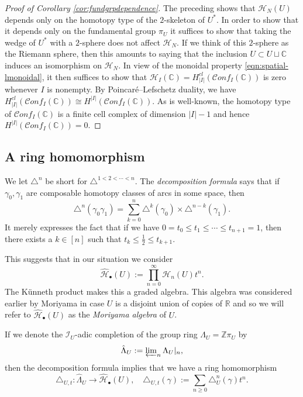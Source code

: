 \documentclass[12pt,letterpaper]{amsart}
\numberwithin{equation}{section}
\def\CC{{\mathbb C}}
\def\RR{{\mathbb R}}
\def\ZZ{{\mathbb Z}}
\def\g{\gamma}
\def\tri{\triangle}
\def\Hcal{{\mathcal H}}
\def\Ical{{\mathcal I}}
\def\half{{\tfrac{1}{2}}}
\def\pt{{\scriptscriptstyle\bullet}}
\newcommand\conf{\mathscr{C}\!\mathit{onf}\!}
\theoremstyle{remark}
\begin{document}
\begin{proof}[Proof of Corollary \ref{cor:fundgrpdependence}]
The preceding shows that $\Hcal_N(U)$ depends only on the homotopy type of the $2$-skeleton of $U^*$. In order to show that it depends only on the fundamental group $\pi_U$ it suffices to show that taking the wedge of $U^*$ with a $2$-sphere does not affect $\Hcal_N$. If we think of this 
 $2$-sphere  as the Riemann sphere, then this amounts to saying that the inclusion $U\subset U\sqcup \CC$ induces an isomorphism on $\Hcal_N$. 
In view of the monoidal  property  \eqref{eqn:spatial-lmonoidal}, it then suffices to show that $\Hcal_I(\CC)=H^{cl}_{|I|}(\conf_I(\CC))$ is zero 
whenever $I$ is nonempty. By Poincar\'e--Lefschetz duality, we have $H^{cl}_{|I|}(\conf_I(\CC))\cong H^{|I|}(\conf_I(\CC))$. 
As is well-known, the homotopy type of $\conf_I(\CC)$ is a finite cell complex of dimension $|I|-1$ and hence $H^{|I|}(\conf_I(\CC))=0$.
\end{proof}


\subsection{A ring homomorphism}
We let $\tri^n$ be short for $\tri^{1<2<\cdots <n}$. The   \emph{decomposition formula} says that 
if  $\g_0,\g_1$ are composable homotopy classes of arcs in some space, then 
\begin{equation}\label{eqn:decformula}
\textstyle  \tri^n(\g_0\g_1)=\sum_{k=0}^n \tri^k(\g_0)\times \tri^{n-k}(\g_1).
\end{equation}
It merely expresses the fact that if we have    $0=t_0\le t_1\le\cdots\le t_{n+1}=1$, then there exists a $k\in [n]$ such that $t_k\le \half \le t_{k+1}$. 

This suggests that in our situation  we consider 
\[
\textstyle \widehat\Hcal_\pt(U):=\prod_{n=0}^\infty \Hcal_n(U)t^n.
\]
The K\"unneth product makes  this a graded algebra. This algebra was considered earlier by Moriyama in case $U$ is a disjoint union of copies of $\RR$ and so we will refer to $\widehat\Hcal_\pt(U)$ as the \emph{Moriyama algebra} of $U$.

If we  denote the $\Ical_U$-adic completion of the group ring $\Lambda_U=\ZZ\pi_U$ by
\[
\textstyle \hat\Lambda_{U}:=\varprojlim_n \Lambda_{U}|_n,
\]
then the decomposition formula implies that we have a ring homomorphism 
\begin{equation}\label{eqn:}
\textstyle \tri_{U,t}:  \hat\Lambda_U \to \widehat\Hcal_\pt(U), \quad   \tri_{U,t}(\g):=\sum_{n\ge 0} \tri_U^n(\g)t^n.
\end{equation}
\end{document}
